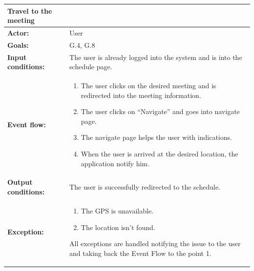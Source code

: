 \begin{tabular} { p{5cm} p{8cm} }  
\textbf{Travel to the meeting}\\
\hline
\textbf{Actor:} & User \\ 
\textbf{Goals:} & G.4, G.8 \\ 
\textbf{Input conditions:} & The user is already logged into the system and is into the schedule page. \\
\textbf{Event flow:} & \begin{enumerate}
				\item
				The user clicks on the desired meeting and is redirected into the meeting information.
				\item
				The user clicks on “Navigate” and goes into navigate page.
				\item
				The navigate page helps the user with indications.
				\item
				When the user is arrived at the desired location, the application notify him.
			\end{enumerate} \\ 
\textbf{Output conditions:} & The user is successfully redirected to the
schedule.\\ 
\textbf{Exception:} & \begin{enumerate}
				\item
				The GPS is unavailable.
				\item
				The location isn’t found. 
			\end{enumerate}
All exceptions are handled notifying the issue to the user and taking back the Event Flow to the point 1. \\
\hline
\end{tabular}


